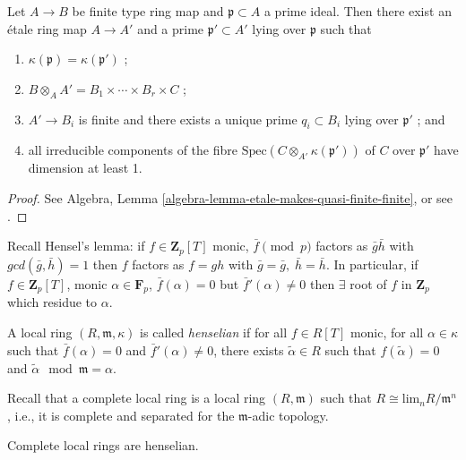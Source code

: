 \begin{theorem}
\label{theorem-quasi-finite-etale-locally}
Let $A\to B$ be finite type ring map and $\mathfrak p \subset A$ a prime
ideal. Then there exist an \'etale ring map $A \to A'$ and a prime
$\mathfrak p' \subset A'$ lying over $\mathfrak p$ such that
\begin{enumerate}
\item
$\kappa(\mathfrak p) = \kappa(\mathfrak p')$ ;
\item
$ B \otimes_A A' = B_1\times \cdots \times B_r \times C$ ;
\item
$ A'\to B_i$ is finite and there exists a unique prime $q_i\subset B_i$ lying
over $\mathfrak p'$ ; and
\item
all irreducible components of the fibre
$\text{Spec}(C\otimes_{A'} \kappa(\mathfrak p'))$ of $C$ over $\mathfrak p'$
have dimension at least 1.
\end{enumerate}
\end{theorem}

\begin{proof}
See Algebra, Lemma \ref{algebra-lemma-etale-makes-quasi-finite-finite}, or
see \cite[Th\'eor\`eme 18.12.1]{EGA4}.
\end{proof}

\noindent
Recall Hensel's lemma: if $f\in \mathbf{Z}_p[T]$ monic, $\bar{f}\pmod{p}$
factors as $\bar g\bar h$ with $gcd(\bar{g}, \bar{h})=1$ then $f$ factors
as $f = gh$ with $\bar{g}=\bar{g}, \; \bar{h}=\bar{h}$.
In particular, if $f \in \mathbf{Z}_p[T]$, monic
$\alpha\in \mathbf{F}_p$, $\bar f(\alpha) =0$ but $\bar f'(\alpha)\neq 0$
then $\exists $ root of $f$ in $\mathbf{Z}_p$ which residue to $\alpha$.


\begin{definition}
\label{definition-henselian}
A local ring $(R, \mathfrak m, \kappa)$ is called {\it henselian} if for all
$f\in R[T]$ monic, for all $\alpha\in \kappa$ such that $\bar f(\alpha)=0$ and
$\bar f'(\alpha)\neq 0$, there exists $\tilde\alpha\in R$ such that
$f(\tilde\alpha) = 0$ and $\tilde\alpha\mod\mathfrak m = \alpha$.
\end{definition}

\noindent
Recall that a complete local ring is a local ring $(R, \mathfrak m)$ such that
$R\cong \text{lim}_n R/\mathfrak m^n$, i.e., it is complete and separated
for the $\mathfrak m$-adic topology.

\begin{theorem}
\label{theorem-hensel}
Complete local rings are henselian.
\end{theorem}

